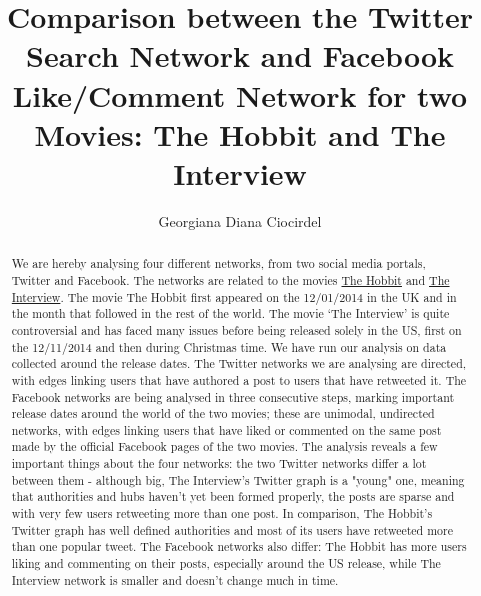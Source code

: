 \documentclass{llncs}
\begin{document}
\title{Comparison between the Twitter Search Network and Facebook Like/Comment
Network for two Movies: The Hobbit and The Interview}
\author{Georgiana Diana Ciocirdel}
\maketitle
%
\begin{abstract}
We are hereby analysing four different networks, from two social media portals,
Twitter and Facebook. The networks are related to the movies
\href{http://www.thehobbit.com/}{The Hobbit} and
\href{http://www.theinterview-movie.com/}{The Interview}. The movie The Hobbit
first appeared on the 12/01/2014 in the UK and in the month that followed in the
rest of the world. The movie ‘The Interview’ is quite controversial and has
faced many issues before being released solely in the US, first on the
12/11/2014 and then during Christmas time. We have run our analysis on data
collected around the release dates. The Twitter networks we are analysing are
directed, with edges linking users that have authored a post to users that have
retweeted it. The Facebook networks are being analysed in three consecutive
steps, marking important release dates around the world of the two movies; these
are unimodal, undirected networks, with edges linking users that have liked or
commented on the same post made by the official Facebook pages of the two
movies. The analysis reveals a few important things about the four networks: the
two Twitter networks differ a lot between them - although big, The Interview's
Twitter graph is a "young" one, meaning that authorities and hubs haven't yet
been formed properly, the posts are sparse and with very few users retweeting
more than one post. In comparison, The Hobbit's Twitter graph has well defined
authorities and most of its users have retweeted more than one popular tweet.
The Facebook networks also differ: The Hobbit has more users liking and
commenting on their posts, especially around the US release, while The Interview
network is smaller and doesn't change much in time.
\end{abstract}
%
\end{document}
